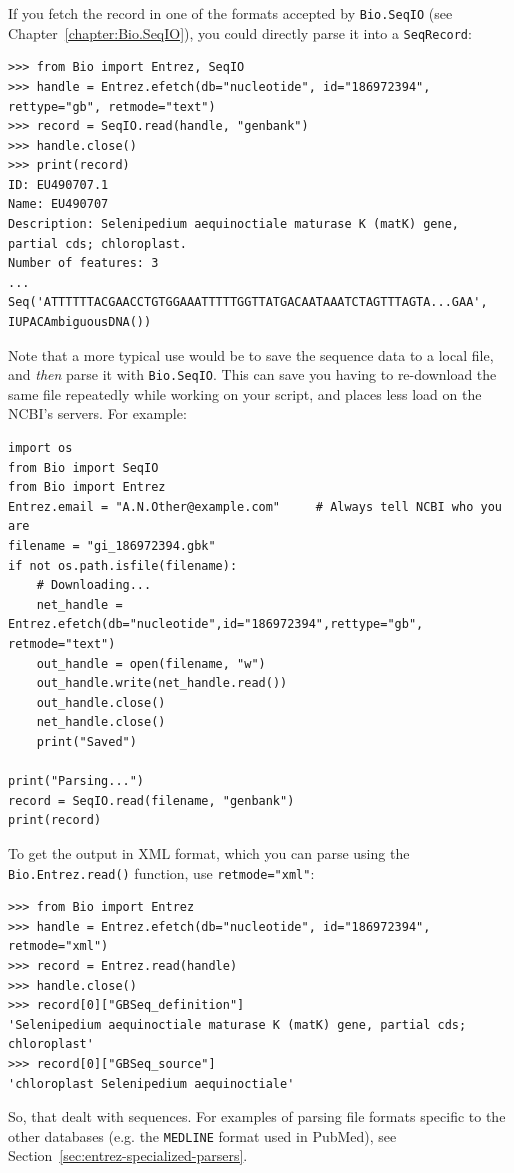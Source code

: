 \documentclass{report}
\begin{document}
If you fetch the record in one of the formats accepted by \verb+Bio.SeqIO+ (see Chapter~\ref{chapter:Bio.SeqIO}), you could directly parse it into a \verb+SeqRecord+:

\begin{verbatim}
>>> from Bio import Entrez, SeqIO
>>> handle = Entrez.efetch(db="nucleotide", id="186972394", rettype="gb", retmode="text")
>>> record = SeqIO.read(handle, "genbank")
>>> handle.close()
>>> print(record)
ID: EU490707.1
Name: EU490707
Description: Selenipedium aequinoctiale maturase K (matK) gene, partial cds; chloroplast.
Number of features: 3
...
Seq('ATTTTTTACGAACCTGTGGAAATTTTTGGTTATGACAATAAATCTAGTTTAGTA...GAA', IUPACAmbiguousDNA())
\end{verbatim}

Note that a more typical use would be to save the sequence data to a local file, and \emph{then} parse it with \verb|Bio.SeqIO|.  This can save you having to re-download the same file repeatedly while working on your script, and places less load on the NCBI's servers.  For example:

\begin{verbatim}
import os
from Bio import SeqIO
from Bio import Entrez
Entrez.email = "A.N.Other@example.com"     # Always tell NCBI who you are
filename = "gi_186972394.gbk"
if not os.path.isfile(filename):
    # Downloading...
    net_handle = Entrez.efetch(db="nucleotide",id="186972394",rettype="gb", retmode="text")
    out_handle = open(filename, "w")
    out_handle.write(net_handle.read())
    out_handle.close()
    net_handle.close()
    print("Saved")

print("Parsing...")
record = SeqIO.read(filename, "genbank")
print(record)
\end{verbatim}

To get the output in XML format, which you can parse using the \verb+Bio.Entrez.read()+ function, use \verb+retmode="xml"+:

\begin{verbatim}
>>> from Bio import Entrez
>>> handle = Entrez.efetch(db="nucleotide", id="186972394", retmode="xml")
>>> record = Entrez.read(handle)
>>> handle.close()
>>> record[0]["GBSeq_definition"] 
'Selenipedium aequinoctiale maturase K (matK) gene, partial cds; chloroplast'
>>> record[0]["GBSeq_source"] 
'chloroplast Selenipedium aequinoctiale'
\end{verbatim}

So, that dealt with sequences. For examples of parsing file formats specific to the other databases (e.g. the \verb+MEDLINE+ format used in PubMed), see Section~\ref{sec:entrez-specialized-parsers}.
\end{document}
